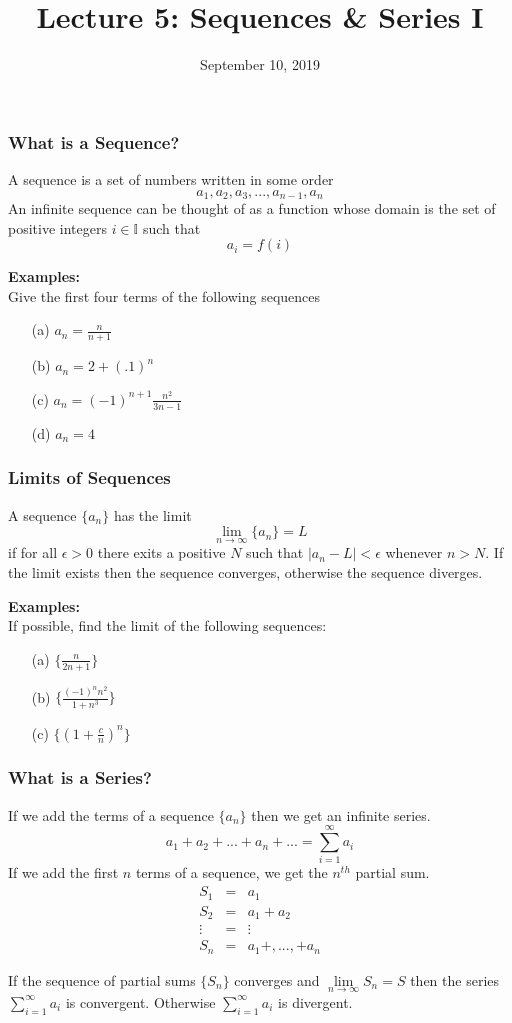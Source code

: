 \documentclass{beamer}
\title{Lecture 5: Sequences \& Series I}
\date{September 10, 2019}
\begin{document}
	
\frame{\titlepage}

\begin{frame}
\frametitle{What is a Sequence?}
A sequence is a set of numbers written in some order
$$a_1, a_2, a_3,...,a_{n-1}, a_n$$
An infinite sequence can be thought of as a function whose domain is the set of positive integers $i \in \mathbb{I}$ such that
$$a_i = f(i)$$

\vspace{6pt}
\textbf{Examples:}\\
Give the first four terms of the following sequences
\begin{itemize}
	\item[(a)] $a_n = \frac{n}{n+1}$
	\item[(b)] $a_n = 2 + (.1)^n$
	\item[(c)] $a_n = (-1)^{n+1} \frac{n^2}{3n-1}$
	\item[(d)] $a_n = 4$
\end{itemize}
\end{frame}

\begin{frame}
\frametitle{Limits of Sequences}
A sequence $\{a_n\}$ has the limit
$$\lim\limits_{n \to \infty} \{a_n\} = L$$
if for all $\epsilon > 0$ there exits a positive $N$ such that $|a_n-L| < \epsilon$ whenever $n>N$. If the limit exists then the sequence converges, otherwise the sequence diverges.

\vspace{6pt}
\textbf{Examples:}\\
If possible, find the limit of the following sequences:
\begin{itemize}
	\item[(a)] $\{\frac{n}{2n+1}\}$
	\item[(b)] $\{ \frac{(-1)^nn^2}{1+n^3}\}$
	\item[(c)] $\{(1+\frac{c}{n})^n\}$
\end{itemize}
\end{frame}

\begin{frame}
\frametitle{What is a Series?}
If we add the terms of a sequence $\{a_n\}$ then we get an infinite series.
$$a_1+a_2+...+a_n+... = \sum_{i=1}^\infty a_i$$
If we add the first $n$ terms of a sequence, we get the $n^{th}$ partial sum.
\begin{eqnarray*}
	S_1 &=& a_1 \\
	S_2 &=& a_1 + a_2\\
	\vdots &=& \vdots\\
	S_n &=& a_1 +,...,+a_n
\end{eqnarray*}

If the sequence of partial sums $\{S_n\}$ converges and $\lim\limits_{n \to \infty}S_n=S$ then the series $\sum_{i=1}^{\infty} a_i$ is convergent. Otherwise  $\sum_{i=1}^{\infty} a_i$ is divergent.

\end{frame}
\end{document}
